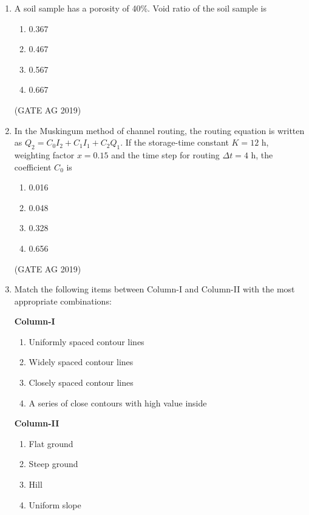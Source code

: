 \documentclass[journal,12pt,onecolumn]{IEEEtran}
\theoremstyle{remark}
\begin{document}
\begin{enumerate}
\item A soil sample has a porosity of 40\%. Void ratio of the soil sample is
\begin{multicols}{4}
\begin{enumerate}
    \item 0.367
    \item 0.467
    \item 0.567
    \item 0.667
\end{enumerate}
\end{multicols}
\hfill{(GATE AG 2019)}


\item  In the Muskingum method of channel routing, the routing equation is written as  
$Q_2 = C_0 I_2 + C_1 I_1 + C_2 Q_1$. If the storage-time constant $K = 12$ h, weighting factor $x = 0.15$ and the time step for routing $\Delta t = 4$ h, the coefficient $C_0$ is
\begin{multicols}{4}
\begin{enumerate}
    \item 0.016
    \item 0.048
    \item 0.328
    \item 0.656
\end{enumerate}
\end{multicols}
\hfill{(GATE AG 2019)}


\item  Match the following items between Column-I and Column-II with the most appropriate      combinations:

\begin{minipage}{0.57\linewidth}
\textbf{Column-I}
\begin{enumerate}
\item[1)] Uniformly spaced contour lines  
\item[2)] Widely spaced contour lines  
\item[3)] Closely spaced contour lines  
\item[4)] A series of close contours with high value inside
\end{enumerate}
\end{minipage}%
\begin{minipage}{0.45\linewidth}
\textbf{Column-II} 
\begin{enumerate}
\item[P)] Flat ground  
\item[Q)] Steep ground  
\item[R)] Hill  
\item[S)] Uniform slope  
\end{enumerate}
\end{minipage}


\end{enumerate}
\end{document}
